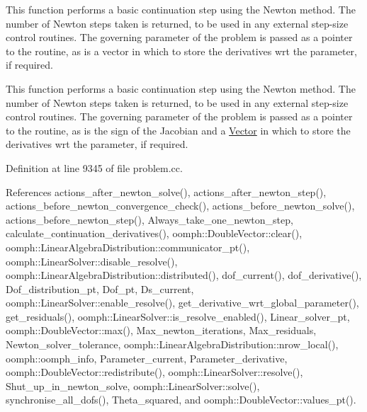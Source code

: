 This function performs a basic continuation step using the Newton method. The number of Newton steps taken is returned, to be used in any external step-\/size control routines. The governing parameter of the problem is passed as a pointer to the routine, as is a vector in which to store the derivatives wrt the parameter, if required. 

This function performs a basic continuation step using the Newton method. The number of Newton steps taken is returned, to be used in any external step-\/size control routines. The governing parameter of the problem is passed as a pointer to the routine, as is the sign of the Jacobian and a \hyperlink{classoomph_1_1Vector}{Vector} in which to store the derivatives wrt the parameter, if required. 

Definition at line 9345 of file problem.\+cc.



References actions\+\_\+after\+\_\+newton\+\_\+solve(), actions\+\_\+after\+\_\+newton\+\_\+step(), actions\+\_\+before\+\_\+newton\+\_\+convergence\+\_\+check(), actions\+\_\+before\+\_\+newton\+\_\+solve(), actions\+\_\+before\+\_\+newton\+\_\+step(), Always\+\_\+take\+\_\+one\+\_\+newton\+\_\+step, calculate\+\_\+continuation\+\_\+derivatives(), oomph\+::\+Double\+Vector\+::clear(), oomph\+::\+Linear\+Algebra\+Distribution\+::communicator\+\_\+pt(), oomph\+::\+Linear\+Solver\+::disable\+\_\+resolve(), oomph\+::\+Linear\+Algebra\+Distribution\+::distributed(), dof\+\_\+current(), dof\+\_\+derivative(), Dof\+\_\+distribution\+\_\+pt, Dof\+\_\+pt, Ds\+\_\+current, oomph\+::\+Linear\+Solver\+::enable\+\_\+resolve(), get\+\_\+derivative\+\_\+wrt\+\_\+global\+\_\+parameter(), get\+\_\+residuals(), oomph\+::\+Linear\+Solver\+::is\+\_\+resolve\+\_\+enabled(), Linear\+\_\+solver\+\_\+pt, oomph\+::\+Double\+Vector\+::max(), Max\+\_\+newton\+\_\+iterations, Max\+\_\+residuals, Newton\+\_\+solver\+\_\+tolerance, oomph\+::\+Linear\+Algebra\+Distribution\+::nrow\+\_\+local(), oomph\+::oomph\+\_\+info, Parameter\+\_\+current, Parameter\+\_\+derivative, oomph\+::\+Double\+Vector\+::redistribute(), oomph\+::\+Linear\+Solver\+::resolve(), Shut\+\_\+up\+\_\+in\+\_\+newton\+\_\+solve, oomph\+::\+Linear\+Solver\+::solve(), synchronise\+\_\+all\+\_\+dofs(), Theta\+\_\+squared, and oomph\+::\+Double\+Vector\+::values\+\_\+pt().

\mbox{\label{classoomph_1_1Problem_aa43a98d2303f2bce10d0887dc0b2eac5}} 
